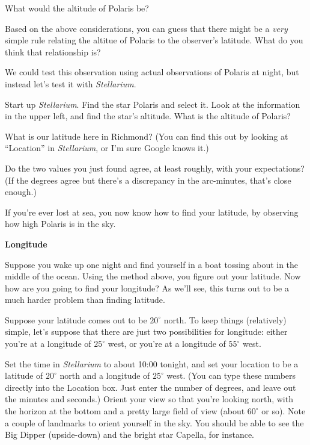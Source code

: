 \answerspace{1in}

What would the altitude of Polaris be?

\answerspace{2in}

Based on the above considerations, you can guess that there might
be a \textit{very} simple rule relating the altitue of Polaris
to the observer's latitude. What do you think that relationship is?

\answerspace{1in}

We could test this observation using actual observations of Polaris at
night, but instead let's test it with \textit{Stellarium}. 

Start up \textit{Stellarium}. 
Find the star Polaris and select it. Look at the information in
the upper left, and find the star's altitude. What is the altitude of
Polaris?

\answerspace{1in}

What is our latitude here in Richmond? (You can find this out by looking
at ``Location'' in \textit{Stellarium}, or I'm sure Google knows it.)

\answerspace{1in}

\pagebreak[2]

Do the two values you just found agree, at least roughly, with your
expectations? (If the degrees agree but there's a discrepancy in the
arc-minutes, that's close enough.)

\answerspace{1in}

If you're ever lost at sea, you now know how to find your latitude,
by observing how high Polaris is in the sky.

{\bf Longitude}

Suppose you wake up one night and find yourself in a boat tossing about
in the middle of the ocean. Using the method above, you figure out
your latitude. Now how are you going to find your longitude? As we'll see,
this
turns out to be a much harder problem than finding latitude.

Suppose your
latitude comes out to be $20^\circ$ north. 
To keep things (relatively) simple, let's suppose that there
are just two possibilities
for longitude: either you're at a longitude of $25^\circ$ west,
or you're at a longitude of $55^\circ$ west. 

Set the time in \textit{Stellarium} to about 10:00 tonight,
and set your location to be a latitude of $20^\circ$ north and
a longitude of $25^\circ$ west. (You can type these numbers
directly into the Location box. Just enter the
number of degrees, and leave out the minutes and
seconds.) Orient your view so that you're looking north,
with the horizon at the bottom and a pretty large 
field of view (about $60^\circ$ or so). Note a couple of
landmarks to orient yourself in the sky. You should be able
to see the Big Dipper (upside-down) and the bright star Capella, for
instance.

